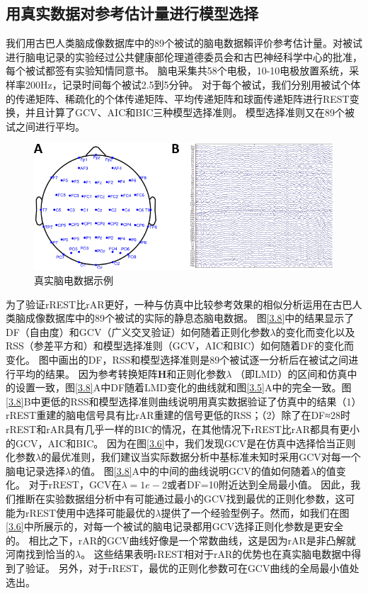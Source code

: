 \subsection{用真实数据对参考估计量进行模型选择}
我们用古巴人类脑成像数据库中的89个被试的脑电数据賴评价参考估计量。对被试进行脑电记录的实验经过公共健康部伦理道德委员会和古巴神经科学中心的批准，每个被试都签有实验知情同意书。 脑电采集共58个电极，10-10电极放置系统，采样率200Hz，记录时间每个被试2.5到5分钟。 对于每个被试，我们分别用被试个体的传递矩阵、稀疏化的个体传递矩阵、平均传递矩阵和球面传递矩阵进行REST变换，并且计算了GCV、AIC和BIC三种模型选择准则。 模型选择准则又在89个被试之间进行平均。 
\begin{figure}[!ht]
	\centering
	\includegraphics[width=15cm]{pic/Frontier/figure7.png}
	\caption{真实脑电数据示例}
	\label{3.7}
\end{figure}
为了验证rREST比rAR更好，一种与仿真中比较参考效果的相似分析运用在古巴人类脑成像数据库中的89个被试的实际的静息态脑电数据。 图\ref{3.8}中的结果显示了DF（自由度）和GCV（广义交叉验证）如何随着正则化参数$\lambda$的变化而变化以及RSS（参差平方和）和模型选择准则（GCV，AIC和BIC）如何随着DF的变化而变化。 图中画出的DF，RSS和模型选择准则是89个被试逐一分析后在被试之间进行平均的结果。 因为参考转换矩阵$\mathbf{H}$和正则化参数$\lambda$ （即LMD）的区间和仿真中的设置一致，图\ref{3.8}A中DF随着LMD变化的曲线就和图\ref{3.5}A中的完全一致。图\ref{3.8}B中更低的RSS和模型选择准则曲线说明用真实数据验证了仿真中的结果（1）rREST重建的脑电信号具有比rAR重建的信号更低的RSS；（2）除了在DF≈28时rREST和rAR具有几乎一样的BIC的情况，在其他情况下rREST比rAR都具有更小的GCV，AIC和BIC。 因为在图\ref{3.6}中，我们发现GCV是在仿真中选择恰当正则化参数$\lambda$的最优准则，我们建议当实际数据分析中基标准未知时采用GCV对每一个脑电记录选择$\lambda$的值。 图\ref{3.8}A中的中间的曲线说明GCV的值如何随着$\lambda$的值变化。 对于rREST，GCV在$\lambda=1e-2$或者DF=10附近达到全局最小值。 因此，我们推断在实验数据组分析中有可能通过最小的GCV找到最优的正则化参数，这可能为rREST使用中选择可能最优的$\lambda$提供了一个经验型例子。然而，如我们在图\ref{3.6}中所展示的，对每一个被试的脑电记录都用GCV选择正则化参数是更安全的。 相比之下，rAR的GCV曲线好像是一个常数曲线，这是因为rAR是非凸解就河南找到恰当的$\lambda$。 这些结果表明rREST相对于rAR的优势也在真实脑电数据中得到了验证。 另外，对于rREST，最优的正则化参数可在GCV曲线的全局最小值处选出。

